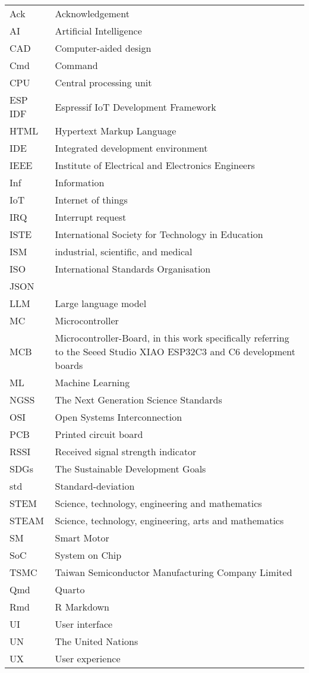 {\begin{longtable}[h]{@{}p{} @{}p{}@{}}
Ack             & Acknowledgement \\
AI              & Artificial Intelligence \\
CAD				& Computer-aided design \\
Cmd             & Command \\
CPU             & Central processing unit \\
ESP IDF         & Espressif IoT Development Framework \\
HTML            & Hypertext Markup Language \\
IDE             & Integrated development environment \\
IEEE            & Institute of Electrical and Electronics Engineers \\
Inf             & Information \\
IoT             & Internet of things \\
IRQ             & Interrupt request \\
ISTE            & International Society for Technology in Education \\
ISM             & industrial, scientific, and medical \\
ISO             & International Standards Organisation \\
JSON            &  \\
LLM             & Large language model \\
MC              & Microcontroller \\
MCB             & Microcontroller-Board, in this work specifically referring to the Seeed Studio XIAO ESP32C3 and C6 development boards \\
ML              & Machine Learning \\
NGSS            & The Next Generation Science Standards \\
OSI             & Open Systems Interconnection \\
PCB             & Printed circuit board \\
RSSI            & Received signal strength indicator \\
SDGs            & The Sustainable Development Goals \\
std             & Standard-deviation \\
STEM            & Science, technology, engineering and mathematics \\
STEAM           & Science, technology, engineering, arts and mathematics \\
SM              & Smart Motor \\
SoC             & System on Chip \\
TSMC            & Taiwan Semiconductor Manufacturing Company Limited \\
Qmd             & Quarto \\
Rmd             & R Markdown \\
UI              & User interface \\
UN              & The United Nations \\
UX              & User experience \\


\end{longtable}}
